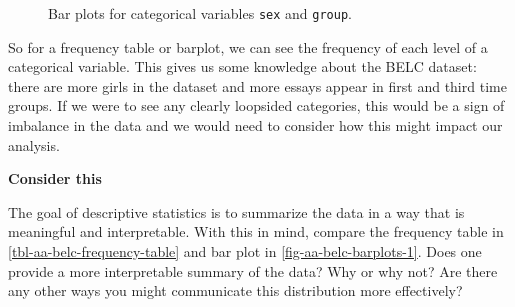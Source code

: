 \documentclass[
  letterpaper,
  DIV=11,
  numbers=noendperiod]{scrreprt}
\theoremstyle{definition}
\theoremstyle{remark}
\begin{document}
\begin{figure}[H]

\begin{minipage}{0.50\linewidth}



\end{minipage}%
%
\begin{minipage}{0.50\linewidth}



\end{minipage}%

\caption{\label{fig-aa-belc-barplots}Bar plots for categorical variables
\texttt{sex} and \texttt{group}.}

\end{figure}%

So for a frequency table or barplot, we can see the frequency of each
level of a categorical variable. This gives us some knowledge about the
BELC dataset: there are more girls in the dataset and more essays appear
in first and third time groups. If we were to see any clearly loopsided
categories, this would be a sign of imbalance in the data and we would
need to consider how this might impact our analysis.

\begin{tcolorbox}[enhanced jigsaw, leftrule=.75mm, colframe=quarto-callout-color-frame, colback=white, rightrule=.15mm, opacityback=0, arc=.35mm, breakable, bottomrule=.15mm, left=2mm, toprule=.15mm]

\textbf{ Consider this}

The goal of descriptive statistics is to summarize the data in a way
that is meaningful and interpretable. With this in mind, compare the
frequency table in \ref{tbl-aa-belc-frequency-table} and bar plot in
\ref{fig-aa-belc-barplots-1}. Does one provide a more interpretable
summary of the data? Why or why not? Are there any other ways you might
communicate this distribution more effectively?

\end{tcolorbox}
\end{document}
